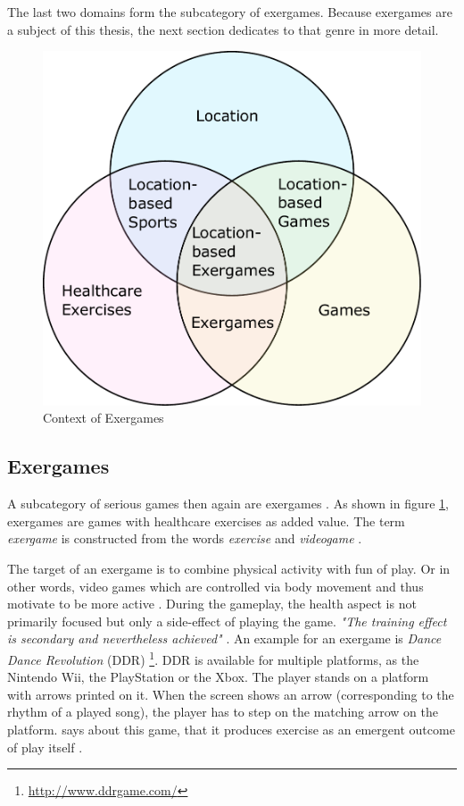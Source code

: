 The last two domains form the subcategory of exergames. Because exergames are a subject of this thesis, the next section dedicates to that genre in more detail.

\begin{figure}[bth]
  \centering
        \includegraphics[width=.55\linewidth]{gfx/exergame_context}
        \caption{Context of Exergames}
        \label{fig:exergameContext}
\end{figure}

\subsection{Exergames}
A subcategory of serious games then again are exergames \citep{gobel2010serious} \citep{knoll2014urban}. As shown in figure \ref{fig:exergameContext}, exergames are games with healthcare exercises as added value. The term \emph{exergame} is constructed from the words \emph{exercise} and \emph{videogame} \citep{bogost2007persuasive}.

The target of an exergame is to combine physical activity with fun of play. Or in other words, video games which are controlled via body movement and thus motivate to be more active \citep{wendel2010adaption}. During the gameplay, the health aspect is not primarily focused but only a side-effect of playing the game. \emph{"The training effect is secondary and nevertheless achieved"} \citep{knoll2014urban}. An example for an exergame is \emph{Dance Dance Revolution} (DDR) \footnote{\url{http://www.ddrgame.com/}}. DDR is available for multiple platforms, as the Nintendo Wii, the PlayStation or the Xbox. The player stands on a platform with arrows printed on it. When the screen shows an arrow (corresponding to the rhythm of a played song), the player has to step on the matching arrow on the platform. \citeauthor{bogost2007persuasive} says about this game, that it produces exercise as an emergent outcome of play itself \citep{bogost2007persuasive}.

